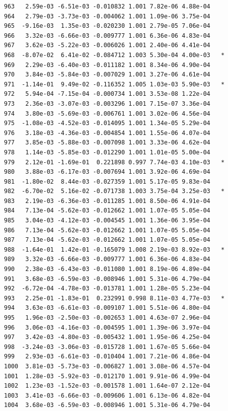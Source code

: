 \documentclass[
  letterpaper,
  DIV=11,
  numbers=noendperiod]{scrartcl}
\begin{document}
\begin{verbatim}
963   2.59e-03 -6.51e-03 -0.010832 1.001 7.82e-06 4.88e-04    
964   2.79e-03 -3.73e-03 -0.004062 1.001 1.09e-06 3.75e-04    
965  -9.16e-03  1.35e-03 -0.020230 1.001 2.79e-05 7.06e-04    
966   3.32e-03 -6.66e-03 -0.009777 1.001 6.36e-06 4.83e-04    
967   3.62e-03 -5.22e-03 -0.006026 1.001 2.40e-06 4.41e-04    
968  -8.07e-02  6.41e-02 -0.084712 1.003 5.30e-04 4.00e-03   *
969   2.29e-03 -6.40e-03 -0.011182 1.001 8.34e-06 4.90e-04    
970   3.84e-03 -5.84e-03 -0.007029 1.001 3.27e-06 4.61e-04    
971  -1.14e-01  9.49e-02 -0.116352 1.005 1.03e-03 5.90e-03   *
972   5.94e-04 -7.15e-04 -0.000734 1.001 3.53e-08 1.22e-04    
973   2.36e-03 -3.07e-03 -0.003296 1.001 7.15e-07 3.36e-04    
974   3.80e-03 -5.69e-03 -0.006761 1.001 3.02e-06 4.56e-04    
975  -1.08e-03 -4.52e-03 -0.014095 1.001 1.34e-05 5.29e-04    
976   3.18e-03 -4.36e-03 -0.004854 1.001 1.55e-06 4.07e-04    
977   3.85e-03 -5.88e-03 -0.007098 1.001 3.33e-06 4.62e-04    
978   1.14e-03 -5.85e-03 -0.012290 1.001 1.01e-05 5.00e-04    
979   2.12e-01 -1.69e-01  0.221898 0.997 7.74e-03 4.10e-03   *
980   3.88e-03 -6.17e-03 -0.007694 1.001 3.92e-06 4.69e-04    
981  -1.80e-02  8.44e-03 -0.027359 1.001 5.17e-05 9.83e-04    
982  -6.70e-02  5.16e-02 -0.071738 1.003 3.75e-04 3.25e-03   *
983   2.19e-03 -6.36e-03 -0.011285 1.001 8.50e-06 4.91e-04    
984   7.13e-04 -5.62e-03 -0.012662 1.001 1.07e-05 5.05e-04    
985   3.04e-03 -4.12e-03 -0.004545 1.001 1.36e-06 3.95e-04    
986   7.13e-04 -5.62e-03 -0.012662 1.001 1.07e-05 5.05e-04    
987   7.13e-04 -5.62e-03 -0.012662 1.001 1.07e-05 5.05e-04    
988  -1.64e-01  1.42e-01 -0.165079 1.008 2.19e-03 8.92e-03   *
989   3.32e-03 -6.66e-03 -0.009777 1.001 6.36e-06 4.83e-04    
990   2.38e-03 -6.43e-03 -0.011080 1.001 8.19e-06 4.89e-04    
991   3.68e-03 -6.59e-03 -0.008946 1.001 5.31e-06 4.79e-04    
992  -6.72e-04 -4.78e-03 -0.013781 1.001 1.28e-05 5.23e-04    
993   2.25e-01 -1.83e-01  0.232991 0.998 8.11e-03 4.77e-03   *
994   3.63e-03 -6.61e-03 -0.009107 1.001 5.51e-06 4.80e-04    
995   1.96e-03 -2.50e-03 -0.002653 1.001 4.63e-07 2.96e-04    
996   3.06e-03 -4.16e-03 -0.004595 1.001 1.39e-06 3.97e-04    
997   3.42e-03 -4.80e-03 -0.005432 1.001 1.95e-06 4.25e-04    
998  -3.24e-03 -3.06e-03 -0.015728 1.001 1.67e-05 5.66e-04    
999   2.93e-03 -6.61e-03 -0.010404 1.001 7.21e-06 4.86e-04    
1000  3.81e-03 -5.73e-03 -0.006827 1.001 3.08e-06 4.57e-04    
1001  1.28e-03 -5.92e-03 -0.012170 1.001 9.91e-06 4.99e-04    
1002  1.23e-03 -1.52e-03 -0.001578 1.001 1.64e-07 2.12e-04    
1003  3.41e-03 -6.66e-03 -0.009606 1.001 6.13e-06 4.82e-04    
1004  3.68e-03 -6.59e-03 -0.008946 1.001 5.31e-06 4.79e-04    

\end{verbatim}
\end{document}
